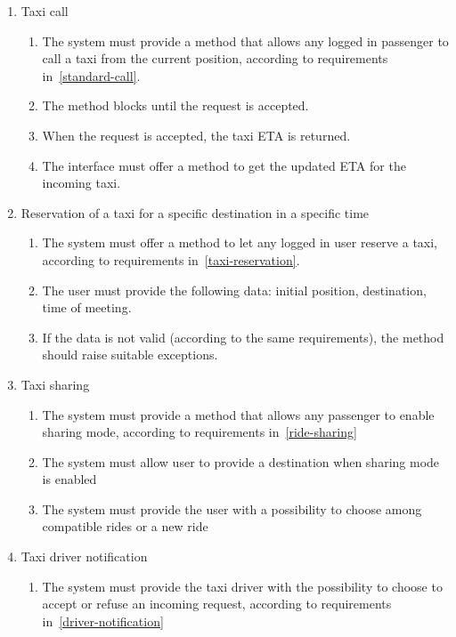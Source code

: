 \begin{enumerate}
\begin{enumerate}
\end{enumerate}
\item Taxi call
\begin{enumerate}
    \item The system must provide a method that allows any logged in passenger to call a taxi from the current position, according to requirements in~\autoref{standard-call}.
    \item The method blocks until the request is accepted.
    \item When the request is accepted, the taxi ETA is returned.
    \item The interface must offer a method to get the updated ETA for the incoming taxi.
\end{enumerate}

\item Reservation of a taxi for a specific destination in a specific time
\begin{enumerate}
    \item The system must offer a method to let any logged in user reserve a taxi, according to requirements in~\autoref{taxi-reservation}.
    \item The user must provide the following data: initial position, destination, time of meeting.
    \item If the data is not valid (according to the same requirements), the method should raise suitable exceptions.
\end{enumerate}

\item Taxi sharing
\begin{enumerate}
	\item The system must provide a method that allows any passenger to enable sharing mode, according to requirements in~\autoref{ride-sharing}
	\item The system must allow user to provide a destination when sharing mode is enabled
	\item The system must provide the user with a possibility to choose among compatible rides or a new ride
\end{enumerate}
\item Taxi driver notification
\begin{enumerate}
	\item The system must provide the taxi driver with the possibility to choose to accept or refuse an incoming request, according to requirements in~\autoref{driver-notification}
\end{enumerate}

\end{enumerate}
